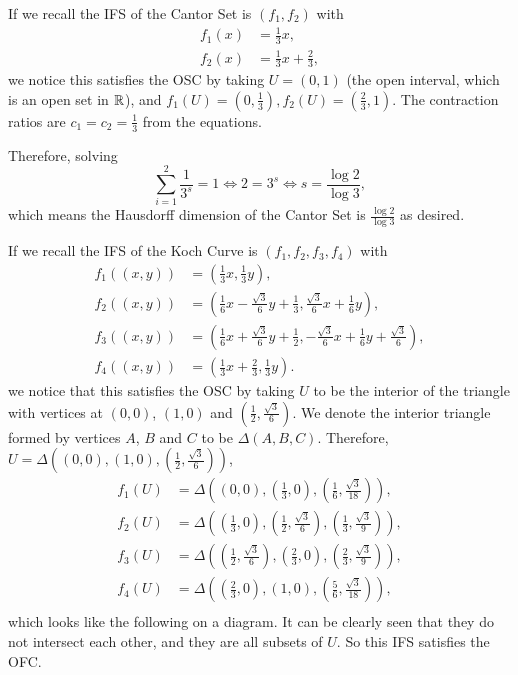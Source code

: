 If we recall the IFS of the Cantor Set is \((f_1, f_2)\) with
\begin{align*}
    f_1(x) &= \frac{1}{3}x,\\
    f_2(x) &= \frac{1}{3}x + \frac{2}{3},
\end{align*}
we notice this satisfies the OSC by taking \(U = (0, 1)\) (the open interval, which is an open set in \(\mathbb{R}\)), and \(f_1(U) = \left(0, \frac{1}{3}\right), f_2(U) = \left(\frac{2}{3}, 1\right)\). The contraction ratios are \(c_1 = c_2 = \frac{1}{3}\) from the equations.

Therefore, solving
\[
\sum_{i = 1}^{2} \frac{1}{3^s} = 1 \iff 2 = 3^s \iff s = \frac{\log 2}{\log 3},
\]
which means the Hausdorff dimension of the Cantor Set is \(\frac{\log 2}{\log 3}\) as desired.

If we recall the IFS of the Koch Curve is \((f_1, f_2, f_3, f_4)\) with
\begin{align*}
    f_1((x, y)) &= \left(\frac{1}{3}x, \frac{1}{3}y\right),\\
    f_2((x, y)) &= \left(\frac{1}{6}x - \frac{\sqrt{3}}{6}y + \frac{1}{3}, \frac{\sqrt{3}}{6}x + \frac{1}{6}y\right),\\
    f_3((x, y)) &= \left(\frac{1}{6}x + \frac{\sqrt{3}}{6}y + \frac{1}{2}, -\frac{\sqrt{3}}{6}x + \frac{1}{6}y + \frac{\sqrt{3}}{6}\right),\\
    f_4((x, y)) &= \left(\frac{1}{3}x + \frac{2}{3}, \frac{1}{3}y\right).
\end{align*}
we notice that this satisfies the OSC by taking \(U\) to be the interior of the triangle with vertices at \((0, 0)\), \((1, 0)\) and \(\left(\frac{1}{2}, \frac{\sqrt{3}}{6}\right)\). We denote the interior triangle formed by vertices \(A\), \(B\) and \(C\) to be \(\Delta(A, B, C)\). Therefore, \(U = \Delta\left((0, 0), (1, 0), \left(\frac{1}{2}, \frac{\sqrt{3}}{6}\right)\right)\),
\begin{align*}
    f_1(U) &= \Delta\left((0, 0), \left(\frac{1}{3},0\right), \left(\frac{1}{6}, \frac{\sqrt{3}}{18}\right)\right),\\
    f_2(U) &= \Delta\left(\left(\frac{1}{3},0\right), \left(\frac{1}{2}, \frac{\sqrt{3}}{6}\right), \left(\frac{1}{3}, \frac{\sqrt{3}}{9}\right) \right),\\
    f_3(U) &= \Delta\left(\left(\frac{1}{2}, \frac{\sqrt{3}}{6}\right), \left(\frac{2}{3},0\right), \left(\frac{2}{3}, \frac{\sqrt{3}}{9}\right)\right),\\
    f_4(U) &= \Delta\left(\left(\frac{2}{3}, 0\right), (1,0), \left(\frac{5}{6}, \frac{\sqrt{3}}{18}\right)\right),\\
\end{align*}
which looks like the following on a diagram. It can be clearly seen that they do not intersect each other, and they are all subsets of \(U\). So this IFS satisfies the OFC.

